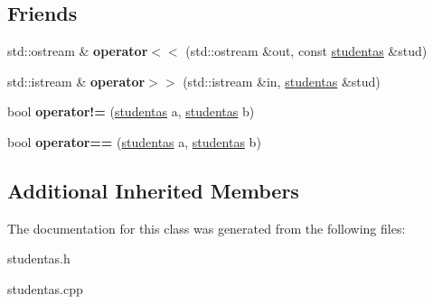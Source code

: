 \subsection*{Friends}
\begin{DoxyCompactItemize}
\item 
\mbox{\label{classstudentas_ad323e3b1d1d447ac6136baa31a45649f}} 
std\+::ostream \& {\bfseries operator$<$$<$} (std\+::ostream \&out, const \hyperlink{classstudentas}{studentas} \&stud)
\item 
\mbox{\label{classstudentas_ad4db4d4fe274dbb25f72829aa7e122ae}} 
std\+::istream \& {\bfseries operator$>$$>$} (std\+::istream \&in, \hyperlink{classstudentas}{studentas} \&stud)
\item 
\mbox{\label{classstudentas_a9e0c1d827ef22c38739fc1750b6ef1b0}} 
bool {\bfseries operator!=} (\hyperlink{classstudentas}{studentas} a, \hyperlink{classstudentas}{studentas} b)
\item 
\mbox{\label{classstudentas_a4e84ff3d0d6a97437db096c9a1d4703a}} 
bool {\bfseries operator==} (\hyperlink{classstudentas}{studentas} a, \hyperlink{classstudentas}{studentas} b)
\end{DoxyCompactItemize}
\subsection*{Additional Inherited Members}


The documentation for this class was generated from the following files\+:\begin{DoxyCompactItemize}
\item 
studentas.\+h\item 
studentas.\+cpp\end{DoxyCompactItemize}
